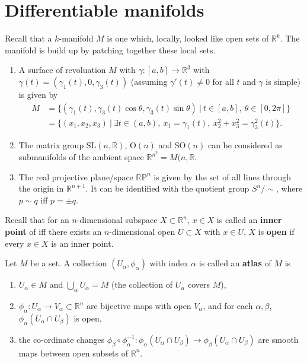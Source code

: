 \documentclass[letter-paper]{tufte-book}
\newenvironment{example}[1][Example]{\begin{trivlist}
\item[\hskip \labelsep {\bfseries #1}]}{\end{trivlist}}
\begin{document}

\chapter{Differentiable manifolds}

Recall that a $k$-manifold $M$ is one which, locally, looked like open sets of $\mathbb{R}^k$. The manifold is build up by patching together these local sets.

\begin{example}
  \begin{enumerate}
    \item A surface of revoluation $M$ with $\gamma : [a, b] \to \mathbb {R}^3$ with $\gamma(t) = (\gamma_1(t), 0, \gamma_3(t))$ (assuming $\gamma'(t) \neq 0$ for all $t$ and $\gamma$ is simple) is given by
    \begin{align*}
      M &= \{ (\gamma_1(t), \gamma_3(t)\cos\theta, \gamma_3(t)\sin\theta)\ |\ t\in[a,b],\ \theta \in [0, 2\pi]\}\\
        &= \{ (x_1, x_2, x_3)\ |\ \exists t\in(a,b),\ x_1 = \gamma_1(t),\ x_2^2 + x_3^2 = \gamma_3^2(t)\}.
    \end{align*}
    
    \item The matrix group $\mbox{SL}(n, \mathbb{R})$, $\mbox{O}(n)$ and $\mbox{SO}(n)$ can be considered as submanifolds of the ambient space $\mathbb{R}^{n^2} = M(n, \mathbb{R}$.
    
    \item The real projective plane/space $\mathbb{R}\mbox{P}^n$ is given by the set of all lines through the origin in $\mathbb{R}^{n+1}$. It can be identified with the quotient group $S^n / \sim$, where $p \sim q$ iff $p = \pm q$.
  \end{enumerate}
\end{example}

Recall that for an $n$-dimensional subspace $X \subset \mathbb{R}^n$, $x \in X$ is called an \textbf{inner point} of iff there exists an $n$-dimensional open $U \subset X$ with $x\in U$. $X$ is \textbf{open} if every $x \in X$ is an inner point.

Let $M$ be a set. A collection $(U_\alpha, \phi_\alpha)$ with index $\alpha$ is called an \textbf{atlas} of $M$ is
\begin{enumerate}
  \item $U_\alpha \in M$ and $\bigcup_\alpha U_\alpha = M$ (the collection of $U_\alpha$ covers $M$),
  
  \item $\phi_\alpha : U_\alpha \to V_\alpha \subset \mathbb{R}^n$ are bijective maps with open $V_\alpha$, and for each $\alpha, \beta$, $\phi_\alpha(U_\alpha \cap U_\beta)$ is open,
  
  \item the co-ordinate changes $\phi_\beta \circ \phi_\alpha^{-1} : \phi_\alpha(U_\alpha \cap U_\beta) \to \phi_\beta(U_\alpha \cap U_\beta)$ are smooth maps between open subsets of $\mathbb{R}^n$.
\end{enumerate}
\end{document}
